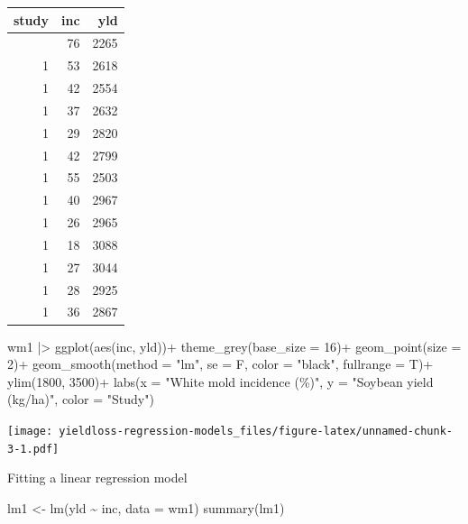 \documentclass[
  letterpaper,
]{book}
\newenvironment{Shaded}{\begin{snugshade}}{\end{snugshade}}
\newcommand{\AttributeTok}[1]{\textcolor[rgb]{0.40,0.45,0.13}{#1}}
\newcommand{\DecValTok}[1]{\textcolor[rgb]{0.68,0.00,0.00}{#1}}
\newcommand{\FunctionTok}[1]{\textcolor[rgb]{0.28,0.35,0.67}{#1}}
\newcommand{\NormalTok}[1]{\textcolor[rgb]{0.00,0.23,0.31}{#1}}
\newcommand{\OtherTok}[1]{\textcolor[rgb]{0.00,0.23,0.31}{#1}}
\newcommand{\SpecialCharTok}[1]{\textcolor[rgb]{0.37,0.37,0.37}{#1}}
\newcommand{\StringTok}[1]{\textcolor[rgb]{0.13,0.47,0.30}{#1}}
\begin{document}
\begin{longtable}[]{@{}rrr@{}}
\toprule\noalign{}
study & inc & yld \\
\midrule\noalign{}
\endhead
\bottomrule\noalign{}
\endlastfoot
1 & 76 & 2265 \\
1 & 53 & 2618 \\
1 & 42 & 2554 \\
1 & 37 & 2632 \\
1 & 29 & 2820 \\
1 & 42 & 2799 \\
1 & 55 & 2503 \\
1 & 40 & 2967 \\
1 & 26 & 2965 \\
1 & 18 & 3088 \\
1 & 27 & 3044 \\
1 & 28 & 2925 \\
1 & 36 & 2867 \\
\end{longtable}

\begin{Shaded}
\begin{Highlighting}[]
\NormalTok{wm1 }\SpecialCharTok{|\textgreater{}} 
  \FunctionTok{ggplot}\NormalTok{(}\FunctionTok{aes}\NormalTok{(inc, yld))}\SpecialCharTok{+}
  \FunctionTok{theme\_grey}\NormalTok{(}\AttributeTok{base\_size =} \DecValTok{16}\NormalTok{)}\SpecialCharTok{+}
  \FunctionTok{geom\_point}\NormalTok{(}\AttributeTok{size =} \DecValTok{2}\NormalTok{)}\SpecialCharTok{+}
  \FunctionTok{geom\_smooth}\NormalTok{(}\AttributeTok{method =} \StringTok{"lm"}\NormalTok{, }\AttributeTok{se =}\NormalTok{ F, }\AttributeTok{color =} \StringTok{"black"}\NormalTok{, }\AttributeTok{fullrange =}\NormalTok{ T)}\SpecialCharTok{+}
  \FunctionTok{ylim}\NormalTok{(}\DecValTok{1800}\NormalTok{, }\DecValTok{3500}\NormalTok{)}\SpecialCharTok{+}
  \FunctionTok{labs}\NormalTok{(}\AttributeTok{x =} \StringTok{"White mold incidence (\%)"}\NormalTok{,}
       \AttributeTok{y =} \StringTok{"Soybean yield (kg/ha)"}\NormalTok{,}
       \AttributeTok{color =} \StringTok{"Study"}\NormalTok{)}
\end{Highlighting}
\end{Shaded}

\texttt{[image: yieldloss-regression-models\_files/figure-latex/unnamed-chunk-3-1.pdf]}

Fitting a linear regression model

\begin{Shaded}
\begin{Highlighting}[]
\NormalTok{lm1 }\OtherTok{\textless{}{-}}  \FunctionTok{lm}\NormalTok{(yld }\SpecialCharTok{\textasciitilde{}}\NormalTok{ inc, }\AttributeTok{data =}\NormalTok{ wm1) }
\FunctionTok{summary}\NormalTok{(lm1)}
\end{Highlighting}
\end{Shaded}
\end{document}
